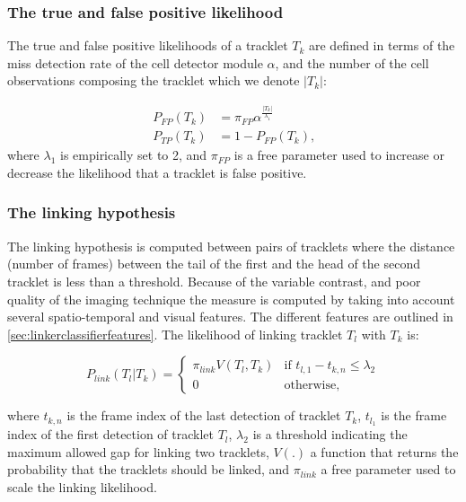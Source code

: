        	\subsubsection{The true and false positive likelihood\statusfirstdraft}
       		
       		The true and false positive likelihoods of a tracklet $T_k$ are defined in terms of the miss detection rate of the cell detector module $\alpha$, and the number of the cell observations composing the tracklet which we denote $|T_k|$:
       		
       		\begin{align*}
	       		P_{FP}(T_k) &= \pi_{FP} \alpha^{\frac{|T_k|}{\lambda_1}} \\
	       		P_{TP}(T_k) &= 1 - P_{FP}(T_k) \text{,}
       		\end{align*}
			\noindent where $ \lambda_1 $ is empirically set to 2, and $\pi_{FP}$ is a free parameter used to increase or decrease the likelihood that a tracklet is false positive.
       		
     	\subsubsection{The linking hypothesis \statusfirstdraft}
     	   	
     	   	The linking hypothesis is computed between pairs of tracklets where the distance (number of frames) between the tail of the first and the head of the second tracklet is less than a threshold. Because of the variable contrast, and poor quality of the imaging technique the measure is computed by taking into account several spatio-temporal and visual features. The different features are outlined in \cref{sec:linkerclassifierfeatures}. The likelihood of linking tracklet $T_l$ with $T_k$ is:
     	   	
     	   	\[
     	   		P_{link}(T_l|T_k) = \begin{cases}
     	   			\pi_{link} V(T_l, T_k)  & \text{if } t_{l,1} - t_{k,n} \leq \lambda_2 \\
     	   			0 & \text{otherwise,}
     	   		\end{cases}
     	   	\]
     	   	
     	   	\noindent where $t_{k,n}$ is the frame index of the last detection of tracklet $T_k$, $t_{l_1}$ is the frame index of the first detection of tracklet $T_l$, $\lambda_2$ is a threshold indicating the maximum allowed gap for linking two tracklets, $V(.)$ a function that returns the probability that the tracklets should be linked, and $\pi_{link}$ a free parameter used to scale the linking likelihood.

